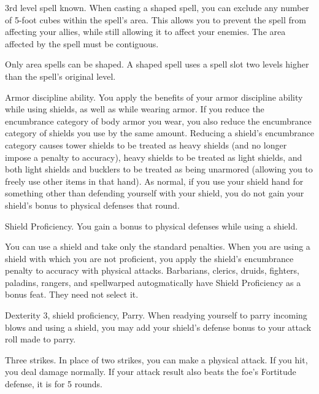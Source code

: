 \featpre 3rd level spell known.
\featben When casting a shaped spell, you can exclude any number of 5-foot cubes within the spell's area.
This allows you to prevent the spell from affecting your allies, while still allowing it to affect your enemies.
The area affected by the spell must be contiguous.

Only area spells can be shaped.
A shaped spell uses a spell slot two levels higher than the spell's original level.

\featpre Armor discipline ability.
\featben You apply the benefits of your armor discipline ability while using shields, as well as while wearing armor.
If you reduce the encumbrance category of body armor you wear, you also reduce the encumbrance category of shields you use by the same amount.
Reducing a shield's encumbrance category causes tower shields to be treated as heavy shields (and no longer impose a  penalty to accuracy), heavy shields to be treated as light shields, and both light shields and bucklers to be treated as being unarmored (allowing you to freely use other items in that hand).
As normal, if you use your shield hand for something other than defending yourself with your shield, you do not gain your shield's bonus to physical defenses that round.

\featpre Shield Proficiency.
\featben You gain a  bonus to physical defenses while using a shield.

\featben You can use a shield and take only the standard penalties.
When you are using a shield with which you are not proficient, you apply the shield's encumbrance penalty to accuracy with physical attacks.
Barbarians, clerics, druids, fighters, paladins, rangers, and spellwarped autogmatically have Shield Proficiency as a bonus feat.
They need not select it.

\featpres Dexterity 3, shield proficiency, Parry.
\featben When readying yourself to parry incoming blows and using a shield, you may add your shield's defense bonus to your attack roll made to parry.

\featpre Three strikes.
\featben In place of two strikes, you can make a physical attack.
If you hit, you deal damage normally.
If your attack result also beats the foe's Fortitude defense, it is \staggered for 5 rounds.

